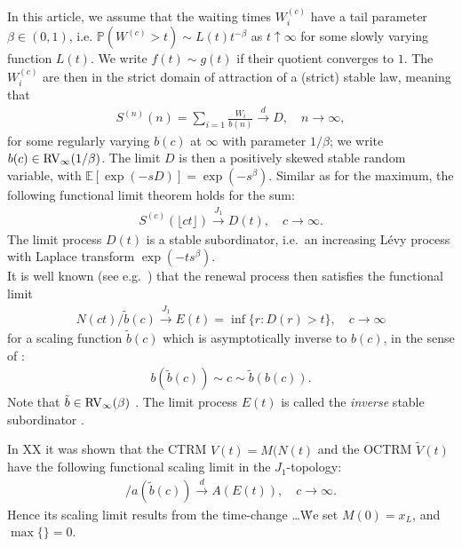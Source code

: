 \documentclass[12pt]{article}
\newcommand{\PP}{\mathbb{P}}
\newcommand{\E}{\mathbb{E}}
\newcommand{\1}{\mathbf 1}
\newcommand{\Floor}[1]{{\lfloor {#1} \rfloor}}
\newcommand{\cJ}{\overset{J_1}{\longrightarrow}}
\begin{document}
In this article, we assume that the waiting times $W^{(c)}_i$ have a tail parameter $\beta \in (0,1)$, i.e. 
$\PP(W^{(c)} > t) \sim L(t) t^{-\beta}$ as $t \uparrow \infty$ for some slowly varying function $L(t)$. We write $f(t) \sim g(t)$ if their quotient converges to $1$. The $W^{(c)}_i$ are then in the strict domain of attraction of a (strict) stable law, meaning that 
\begin{align}\label{eq:sclt}
S^{(n)}(n) = \sum_{i=1} \frac{W_i}{b(n)} \overset{d}{\longrightarrow} D, 
\quad n \to \infty,
\end{align}
for some regularly varying $b(c)$ at $\infty$ with parameter $1/\beta$;
we write $b(c) \in {\rm RV}_\infty(1/\beta)$.
The limit $D$ is then a positively skewed stable random variable, with
$\E[\exp(-sD)] = \exp(-s^\beta)$.
Similar as for the maximum, the following functional limit theorem holds for the sum:
\begin{align}
S^{(c)}(\Floor{ct}) \overset{J_1}{\longrightarrow} D(t), 
\quad c \to \infty.
\end{align}
The limit process $D(t)$ is a stable subordinator, i.e.\ an increasing
L\'evy process with Laplace transform $\exp(-t s^\beta)$.\\ 
It is well known (see e.g.\ \cite{limitCTRW}) that the renewal process then satisfies the functional limit
\begin{align}
N(ct)/\tilde b(c) \cJ E(t) = \inf\{r: D(r) > t\}, 
\quad c \to \infty
\end{align}
for a scaling function $\tilde b(c)$ which is asymptotically inverse to $b(c)$, in the sense of \cite[p.20]{seneta}: 
\begin{align}\label{eq:tildeb}
b(\tilde b(c)) \sim c \sim \tilde b(b(c)).
\end{align}
Note that $\tilde b \in {\rm RV}_\infty(\beta)$ 
\cite{limitCTRW}.
The limit process $E(t)$ is called the \emph{inverse} stable subordinator \cite{invSubord}.

In XX it was shown that the CTRM $V(t) = M(N(t)$ and the OCTRM $\tilde V(t)$ have the following functional scaling limit in the $J_1$-topology: 
\begin{align*}
[V(ct) - d(\tilde b(c))] / a(\tilde b(c)) \stackrel{d}{\to} 
A(E(t)), \quad c \to \infty.
\end{align*}
Hence its scaling limit results from the time-change \ldots \. We set $M(0) = x_L$, and $\max\{\} = 0$. 
\end{document}
